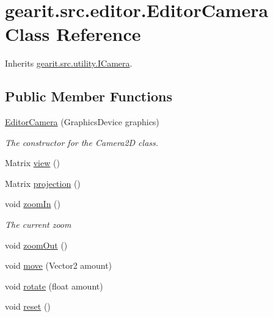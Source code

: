 \hypertarget{classgearit_1_1src_1_1editor_1_1_editor_camera}{\section{gearit.\+src.\+editor.\+Editor\+Camera Class Reference}
\label{classgearit_1_1src_1_1editor_1_1_editor_camera}
}


Inherits \hyperlink{interfacegearit_1_1src_1_1utility_1_1_i_camera}{gearit.\+src.\+utility.\+I\+Camera}.

\subsection*{Public Member Functions}
\begin{DoxyCompactItemize}
\item 
\hyperlink{classgearit_1_1src_1_1editor_1_1_editor_camera_afcc9ca983a1414e3b01e99e1bfc10cc2}{Editor\+Camera} (Graphics\+Device graphics)
\begin{DoxyCompactList}\small\item\em The constructor for the Camera2\+D class. \end{DoxyCompactList}\item 
Matrix \hyperlink{classgearit_1_1src_1_1editor_1_1_editor_camera_a9cb0705a909e33866641570d3e253fc2}{view} ()
\item 
Matrix \hyperlink{classgearit_1_1src_1_1editor_1_1_editor_camera_ae70a760b033216c996d0c96f66e8f6c1}{projection} ()
\item 
void \hyperlink{classgearit_1_1src_1_1editor_1_1_editor_camera_afd95edbd7c7b77fdbf5b04c1c9cddfb8}{zoom\+In} ()
\begin{DoxyCompactList}\small\item\em The current zoom \end{DoxyCompactList}\item 
void \hyperlink{classgearit_1_1src_1_1editor_1_1_editor_camera_aae75fd1e6510a740596d069cceb20cff}{zoom\+Out} ()
\item 
void \hyperlink{classgearit_1_1src_1_1editor_1_1_editor_camera_a79dadedfe10340c5d9d6d44d40450d91}{move} (Vector2 amount)
\item 
void \hyperlink{classgearit_1_1src_1_1editor_1_1_editor_camera_a279e6bbfe86cba526880364104d69a3f}{rotate} (float amount)
\item 
void \hyperlink{classgearit_1_1src_1_1editor_1_1_editor_camera_a044cfdf432b0f11c51bfbed9a32b3cd2}{reset} ()

\end{DoxyCompactItemize}
